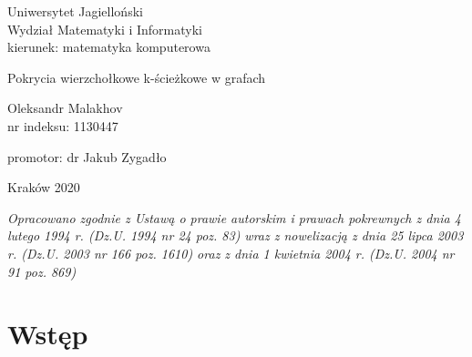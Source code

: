\documentclass[12pt]{report}
\begin{document}
	
\begin{titlepage}
	\begin{center}
		\large 
		Uniwersytet Jagielloński\\
		Wydział Matematyki i Informatyki\\
		kierunek: matematyka komputerowa
		
		\vspace{5.0cm}
		\huge
		Pokrycia wierzchołkowe k-ścieżkowe w grafach
		
		\vspace{1.0cm}
		\large
		Oleksandr Malakhov \\
		nr indeksu: 1130447
	\end{center}
	
	\vspace{3.0cm}
	\begin{flushright}
		promotor: dr Jakub Zygadło
	\end{flushright}
	
	\vspace{2.6cm}
	\begin{center}
		\footnotesize
		Kraków 2020
	\end{center}
	\tiny\textit{Opracowano zgodnie z Ustawą o prawie autorskim i prawach pokrewnych z dnia 4 lutego 1994 r. (Dz.U. 1994 nr 24 poz. 83) wraz z nowelizacją z dnia 25 lipca 2003 r. (Dz.U. 2003 nr 166 poz. 1610) oraz z dnia 1 kwietnia 2004 r. (Dz.U. 2004 nr 91 poz. 869)}
\end{titlepage}
	
\tableofcontents

\chapter{Wstęp}
\end{document}
